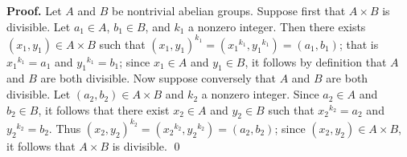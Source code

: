 \begin{enumerate}
      \textbf{Proof.} Let $A$ and $B$ be nontrivial abelian groups. Suppose
      first that $A \times B$ is divisible. Let $a_1 \in A$, $b_1 \in B$, and
      $k_1$ a nonzero integer. Then there exists $(x_1, y_1) \in A \times B$
      such that $(x_1, y_1)^{k_1} = ({x_1}^{k_1}, {y_1}^{k_1}) = (a_1, b_1)$;
      that is ${x_1}^{k_1} = a_1$ and ${y_1}^{k_1} = b_1$; since $x_1 \in A$ and
      $y_1 \in B$, it follows by definition that $A$ and $B$ are both divisible.
      Now suppose conversely that $A$ and $B$ are both divisible. Let
      $(a_2, b_2) \in A \times B$ and $k_2$ a nonzero integer. Since $a_2 \in A$
      and $b_2 \in B$, it follows that there exist $x_2 \in A$ and $y_2 \in B$
      such that ${x_2}^{k_2} = a_2$ and ${y_2}^{k_2} = b_2$. Thus
      $(x_2, y_2)^{k_2} = ({x_2}^{k_2}, {y_2}^{k_2}) = (a_2, b_2)$; since
      $(x_2, y_2) \in A \times B$, it follows that $A \times B$ is divisible.
      \qed
\end{enumerate}
